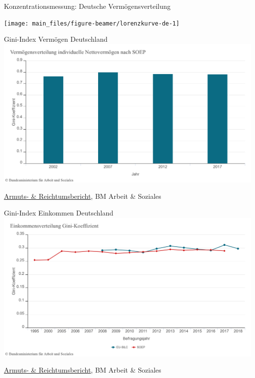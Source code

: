 \documentclass[
  10pt,
  ignorenonframetext,
]{beamer}
\begin{document}
\begin{frame}{Konzentrationsmessung: Deutsche Vermögensverteilung}
\label{konzentrationsmessung-deutsche-vermuxf6gensverteilung}
\scriptsize\normalsize

\scriptsize

\begin{center}\texttt{[image: main\_files/figure-beamer/lorenzkurve-de-1]} \end{center}

\normalsize
\end{frame}

\begin{frame}{Gini-Index Vermögen Deutschland}
\label{gini-index-vermuxf6gen-deutschland}
\includegraphics[width = \textwidth]{pics/gini-vermoegen-de-zeitreihe.png}

\scriptsize

\href{https://www.armuts-und-reichtumsbericht.de/DE/Indikatoren/Gesellschaft/Vermoegensverteilung/G02-Indikator-Vermoegensverwaltung.html}{Armuts-
\& Reichtumsbericht}, BM Arbeit \& Soziales
\end{frame}

\begin{frame}{Gini-Index Einkommen Deutschland}
\label{gini-index-einkommen-deutschland}
\includegraphics[width = \textwidth]{pics/gini-einkommen-de-zeitreihe.png}

\scriptsize

\href{https://www.armuts-und-reichtumsbericht.de/DE/Indikatoren/Gesellschaft/Einkommensverteilung/G01-Indikator-Einkommensverteilung.html}{Armuts-
\& Reichtumsbericht}, BM Arbeit \& Soziales
\end{frame}
\end{document}
